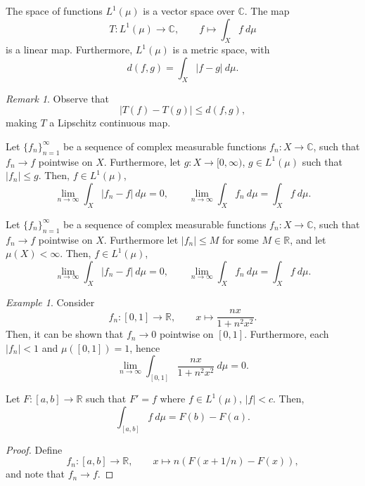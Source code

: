 \documentclass[11pt]{article}
\newcommand{\C}{\mathbb{C}}
\newcommand{\R}{\mathbb{R}}
\theoremstyle{definition}
\theoremstyle{remark}
\newtheorem*{remark}{Remark}
\newtheorem*{example}{Example}
\numberwithin{equation}{section}
\begin{document}
    \begin{theorem}
        The space of functions $L^1(\mu)$ is a vector space over $\C$.
        The map \[
            T\colon L^1(\mu) \to \C, \qquad f \mapsto \int_X f\:d\mu
        \] is a linear map. Furthermore, $L^1(\mu)$ is a metric space, with \[
            d(f, g) = \int_X |f - g|\:d\mu.
        \] 
        \begin{remark}
            Observe that \[
                |T(f) - T(g)| \leq d(f, g),
            \] making $T$ a Lipschitz continuous map.
        \end{remark}
    \end{theorem}


    \begin{theorem}
        Let $\{f_n\}_{n = 1}^\infty$ be a sequence of complex measurable functions
        $f_n\colon X \to \C$, such that $f_n \to f$ pointwise on $X$. Furthermore,
        let $g\colon X \to [0, \infty)$, $g \in L^1(\mu)$ such that $|f_n| \leq g$.
        Then, $f \in L^1(\mu)$, \[
            \lim_{n \to \infty} \int_X |f_n - f| \:d\mu = 0, \qquad
            \lim_{n \to \infty} \int_X f_n \:d\mu = \int_X f \:d\mu.
        \] 
    \end{theorem}

    \begin{corollary}
        Let $\{f_n\}_{n = 1}^\infty$ be a sequence of complex measurable functions
        $f_n\colon X \to \C$, such that $f_n \to f$ pointwise on $X$.
        Furthermore let $|f_n| \leq M$ for some $M \in \R$, and let $\mu(X) <
        \infty$. Then, $f \in L^1(\mu)$, \[
            \lim_{n \to \infty} \int_X |f_n - f| \:d\mu = 0, \qquad
            \lim_{n \to \infty} \int_X f_n \:d\mu = \int_X f \:d\mu.
        \] 
    \end{corollary}

    \begin{example}
        Consider \[
            f_n \colon [0, 1] \to \R, \qquad x \mapsto \frac{nx}{1 + n^2x^2}.
        \] Then, it can be shown that $f_n \to 0$ pointwise on $[0, 1]$. Furthermore,
        each $|f_n| < 1$ and $\mu([0, 1]) = 1$, hence \[
            \lim_{n \to \infty} \int_{[0, 1]} \frac{nx}{1 + n^2x^2}\:d\mu = 0.
        \] 
    \end{example}


    \begin{theorem}
        Let $F\colon [a, b] \to \R$ such that $F' = f$ where $f \in L^1(\mu)$, $|f| <
        c$. Then, \[
            \int_{[a, b]} f \:d\mu = F(b) - F(a).
        \] 
    \end{theorem}
    \begin{proof}
        Define \[
            f_n\colon [a, b] \to \R, \qquad x \mapsto n(F(x + 1 / n) - F(x)),
        \] and note that $f_n \to f$.
    \end{proof}
\end{document}
